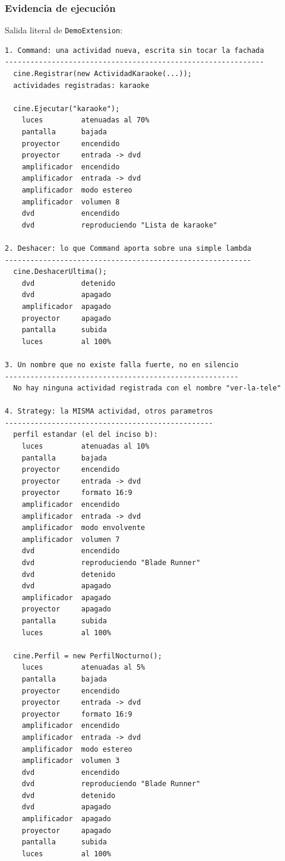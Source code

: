 \subsubsection*{Evidencia de ejecución}

Salida literal de \texttt{DemoExtension}:

{\footnotesize
\begin{verbatim}
1. Command: una actividad nueva, escrita sin tocar la fachada
-------------------------------------------------------------
  cine.Registrar(new ActividadKaraoke(...));
  actividades registradas: karaoke

  cine.Ejecutar("karaoke");
    luces         atenuadas al 70%
    pantalla      bajada
    proyector     encendido
    proyector     entrada -> dvd
    amplificador  encendido
    amplificador  entrada -> dvd
    amplificador  modo estereo
    amplificador  volumen 8
    dvd           encendido
    dvd           reproduciendo "Lista de karaoke"

2. Deshacer: lo que Command aporta sobre una simple lambda
----------------------------------------------------------
  cine.DeshacerUltima();
    dvd           detenido
    dvd           apagado
    amplificador  apagado
    proyector     apagado
    pantalla      subida
    luces         al 100%

3. Un nombre que no existe falla fuerte, no en silencio
-------------------------------------------------------
  No hay ninguna actividad registrada con el nombre "ver-la-tele"

4. Strategy: la MISMA actividad, otros parametros
-------------------------------------------------
  perfil estandar (el del inciso b):
    luces         atenuadas al 10%
    pantalla      bajada
    proyector     encendido
    proyector     entrada -> dvd
    proyector     formato 16:9
    amplificador  encendido
    amplificador  entrada -> dvd
    amplificador  modo envolvente
    amplificador  volumen 7
    dvd           encendido
    dvd           reproduciendo "Blade Runner"
    dvd           detenido
    dvd           apagado
    amplificador  apagado
    proyector     apagado
    pantalla      subida
    luces         al 100%

  cine.Perfil = new PerfilNocturno();
    luces         atenuadas al 5%
    pantalla      bajada
    proyector     encendido
    proyector     entrada -> dvd
    proyector     formato 16:9
    amplificador  encendido
    amplificador  entrada -> dvd
    amplificador  modo estereo
    amplificador  volumen 3
    dvd           encendido
    dvd           reproduciendo "Blade Runner"
    dvd           detenido
    dvd           apagado
    amplificador  apagado
    proyector     apagado
    pantalla      subida
    luces         al 100%


\end{verbatim}}
